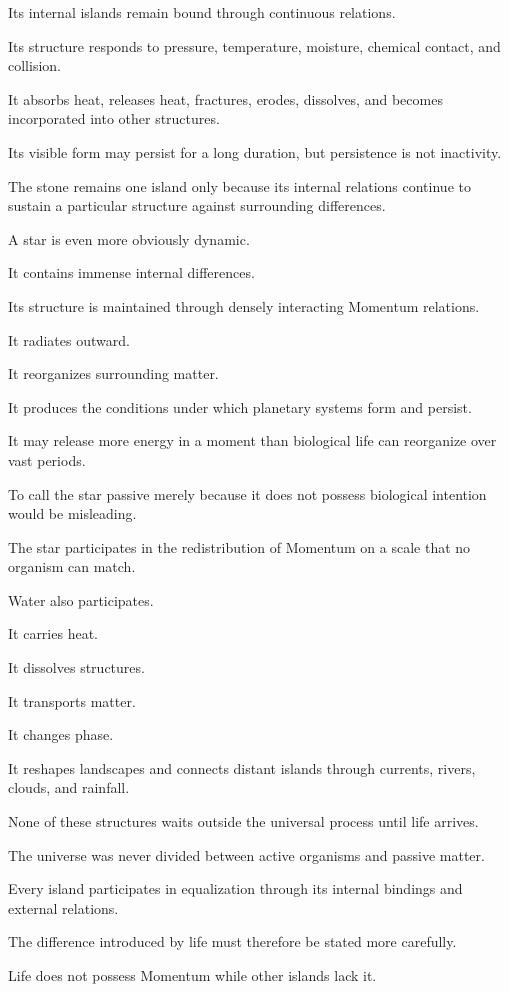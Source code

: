 Its internal islands remain bound through continuous relations.

Its structure responds to pressure, temperature, moisture, chemical contact, and collision.

It absorbs heat, releases heat, fractures, erodes, dissolves, and becomes incorporated into other structures.

Its visible form may persist for a long duration, but persistence is not inactivity.

The stone remains one island only because its internal relations continue to sustain a particular structure against surrounding differences.

A star is even more obviously dynamic.

It contains immense internal differences.

Its structure is maintained through densely interacting Momentum relations.

It radiates outward.

It reorganizes surrounding matter.

It produces the conditions under which planetary systems form and persist.

It may release more energy in a moment than biological life can reorganize over vast periods.

To call the star passive merely because it does not possess biological intention would be misleading.

The star participates in the redistribution of Momentum on a scale that no organism can match.

Water also participates.

It carries heat.

It dissolves structures.

It transports matter.

It changes phase.

It reshapes landscapes and connects distant islands through currents, rivers, clouds, and rainfall.

None of these structures waits outside the universal process until life arrives.

The universe was never divided between active organisms and passive matter.

Every island participates in equalization through its internal bindings and external relations.

The difference introduced by life must therefore be stated more carefully.

Life does not possess Momentum while other islands lack it.

